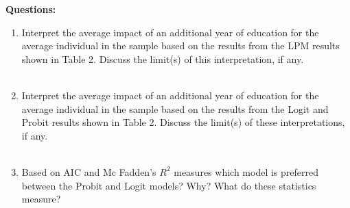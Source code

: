 \documentclass{article}
\begin{document}
\textbf{Questions:}
\begin{enumerate}
    \item Interpret the average impact of an additional year of education for the average individual in the sample based on the results from the LPM results shown in Table 2. Discuss the limit(s) of this interpretation, if any. \\[1em]
\\[1em]


    \item Interpret the average impact of an additional year of education for the average individual in the sample based on the results from the Logit and Probit results shown in Table 2. Discuss the limit(s) of these interpretations, if any.\\[1em]
\\[1em]

\item Based on AIC and Mc Fadden's $R^2$ measures which model is preferred
between the Probit and Logit models? Why? What do these statistics measure?\\[1em]
\end{enumerate}
\end{document}
